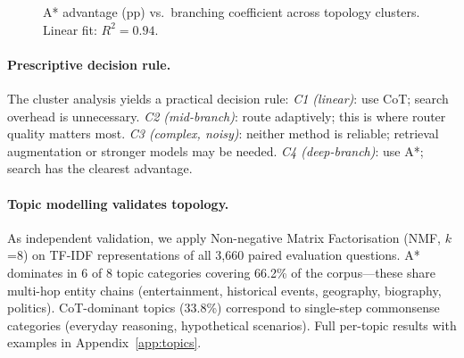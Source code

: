 \documentclass{article}
\begin{document}
\begin{figure}[t]
\centering

\caption{A* advantage (pp) vs.\ branching coefficient across topology clusters. Linear fit: $R^2=0.94$.}
\label{fig:topology_scatter}
\end{figure}

\paragraph{Prescriptive decision rule.}
The cluster analysis yields a practical decision rule: \emph{C1 (linear)}: use CoT; search overhead is unnecessary. \emph{C2 (mid-branch)}: route adaptively; this is where router quality matters most. \emph{C3 (complex, noisy)}: neither method is reliable; retrieval augmentation or stronger models may be needed. \emph{C4 (deep-branch)}: use A*; search has the clearest advantage.

\paragraph{Topic modelling validates topology.}
As independent validation, we apply Non-negative Matrix Factorisation (NMF, $k$=8) on TF-IDF representations of all 3,660 paired evaluation questions. A* dominates in 6 of 8 topic categories covering 66.2\% of the corpus---these share multi-hop entity chains (entertainment, historical events, geography, biography, politics). CoT-dominant topics (33.8\%) correspond to single-step commonsense categories (everyday reasoning, hypothetical scenarios). Full per-topic results with examples in Appendix~\ref{app:topics}.
\end{document}
